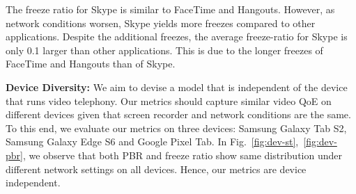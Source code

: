 The freeze ratio for Skype is similar to FaceTime and Hangouts. However, as network conditions worsen, Skype yields more freezes compared to other applications. Despite the additional freezes, the average freeze-ratio for Skype is only 0.1 larger than other applications. This is due to the longer freezes of FaceTime and Hangouts than of Skype.

\noindent \textbf{Device Diversity:} We aim to devise a model that is independent of the device that runs video telephony. Our metrics should capture similar video QoE on different devices given that screen recorder and network conditions are the same. To this end, we evaluate our metrics on three devices: Samsung Galaxy Tab S2, Samsung Galaxy Edge S6 and Google Pixel Tab. 
In Fig.~\ref{fig:dev-st},~\ref{fig:dev-pbr}, we observe that both PBR and freeze ratio show same distribution under different network settings on all devices. Hence, our metrics are device independent.
